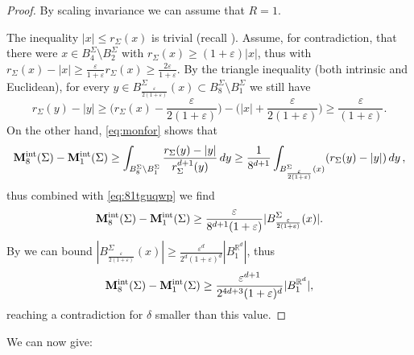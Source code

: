 \documentclass{article}
\newcommand{\eps}{\varepsilon}
\newcommand{\R}{\mathbb{R}}
\theoremstyle{definition}
\begin{document}
\begin{proof}
By scaling invariance we can assume that $R=1$.

    The inequality $|x|\leq r_\Sigma(x)$ is trivial (recall ). Assume, for contradiction, that there were $x\in B_{4}^\Sigma\setminus B_{2}^\Sigma$ with $r_\Sigma(x)\geq (1+\eps)|x|$, thus with $r_\Sigma(x)-|x|\geq \frac{\eps}{1+\eps}r_\Sigma(x)\geq \frac{2\eps}{1+\eps}$. By the triangle inequality (both intrinsic and Euclidean), for every $y\in B_{\frac{\eps}{2(1+\eps)}}^\Sigma(x)\subset B_8^\Sigma\setminus B_1^\Sigma$ we still have
    \begin{equation}\label{eq:81tguqwp}
        r_\Sigma(y)-|y|\geq \big(r_\Sigma(x)-\frac{\eps}{2(1+\eps)}\big)-\big(|x|+\frac{\eps}{2(1+\eps)}\big)\geq \frac{\eps}{(1+\eps)}.
    \end{equation}
    On the other hand, \eqref{eq:monfor} shows that
    $$
    {\bf M}_8^{\rm int}(\Sigma)-{\bf M}_1^{\rm int}(\Sigma)\geq \int_{B_8^\Sigma\setminus B_1^\Sigma} \frac{r_\Sigma(y)-|y|}{r_\Sigma^{d+1}(y)}\,dy\geq \frac{1}{8^{d+1}}\int_{B_{\frac{\eps}{2(1+\eps)}}^\Sigma(x)} (r_\Sigma(y)-|y|)\,dy\,,
    $$
    thus combined with \eqref{eq:81tguqwp} we find
    $$
    {\bf M}_8^{\rm int}(\Sigma)-{\bf M}_1^{\rm int}(\Sigma) \geq \frac{\eps}{8^{d+1}(1+\eps)}|B_{\frac{\eps}{2(1+\eps)}}^\Sigma(x)|.
    $$
    By  we can bound $|B_{\frac{\eps}{2(1+\eps)}}^\Sigma(x)|\geq \frac{\eps^d}{2^d(1+\eps)^d}|B_1^{\R^d}|$, thus
    $$
    {\bf M}_8^{\rm int}(\Sigma)-{\bf M}_1^{\rm int}(\Sigma) \geq \frac{\eps^{d+1}}{2^{4d+3}(1+\eps)^d}|B_1^{\R^d}|,
    $$
    reaching a contradiction for $\delta$ smaller than this value.
\end{proof}
We can now give:
\end{document}
